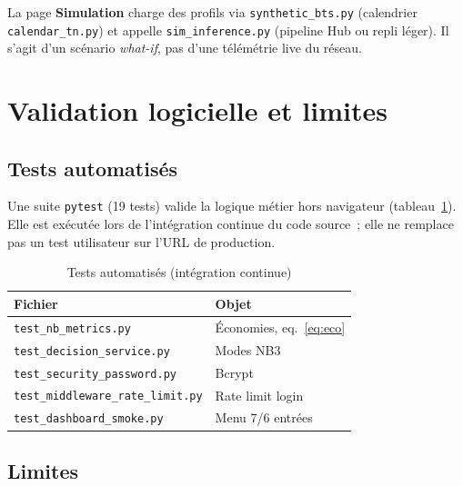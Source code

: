 La page \textbf{Simulation} charge des profils via \texttt{synthetic\_bts.py}
(calendrier \texttt{calendar\_tn.py}) et appelle \texttt{sim\_inference.py}
(pipeline Hub ou repli léger). Il s'agit d'un scénario \emph{what-if}, pas d'une
télémétrie live du réseau.


\section{Validation logicielle et limites}
\label{sec:dep-tests}

\subsection{Tests automatisés}
\label{subsec:dep-tests-suite}

Une suite \texttt{pytest} (19 tests) valide la logique métier hors navigateur
(tableau~\ref{tab:tests}). Elle est exécutée lors de l'intégration continue du
code source~; elle ne remplace pas un test utilisateur sur l'URL de production.

\begin{table}[htbp]
  \centering
  \caption{Tests automatisés (intégration continue)}
  \label{tab:tests}
  \begin{tabular}{@{}p{7cm}p{7cm}@{}}
    \toprule
    \textbf{Fichier} & \textbf{Objet} \\
    \midrule
    \texttt{test\_nb\_metrics.py} & Économies, eq.~\eqref{eq:eco} \\
    \texttt{test\_decision\_service.py} & Modes NB3 \\
    \texttt{test\_security\_password.py} & Bcrypt \\
    \texttt{test\_middleware\_rate\_limit.py} & Rate limit login \\
    \texttt{test\_dashboard\_smoke.py} & Menu 7/6 entrées \\
    \bottomrule
  \end{tabular}
\end{table}


\subsection{Limites}
\label{subsec:dep-limites}

